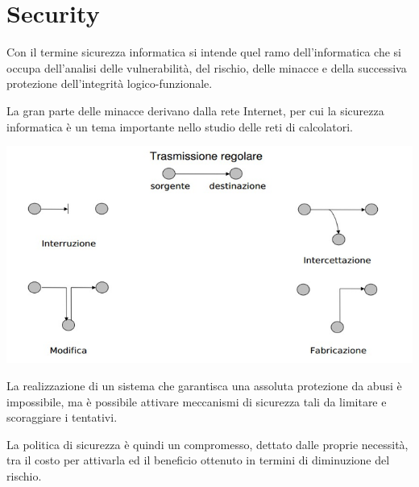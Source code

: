 \section{Security}
    Con il termine sicurezza informatica si intende quel ramo dell'informatica che si occupa dell'analisi delle vulnerabilità, del rischio, delle minacce e della successiva protezione dell'integrità logico-funzionale.

    La gran parte delle minacce derivano dalla rete Internet, per cui la sicurezza informatica è un tema importante nello studio delle reti di calcolatori.

    \begin{center}
        \includegraphics[scale=0.4]{chapters/7/assets/schema_a.png}
    \end{center}

    La realizzazione di un sistema che garantisca una assoluta protezione da abusi è impossibile, ma è possibile attivare meccanismi di sicurezza tali da limitare e scoraggiare i tentativi.

    La politica di sicurezza è quindi un compromesso, dettato dalle proprie necessità, tra il costo per attivarla ed il beneficio ottenuto in termini di diminuzione del rischio.

